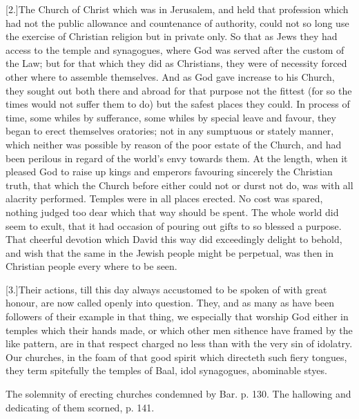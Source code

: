 [2.]The Church of Christ which was in Jerusalem, and held that profession which had not the public allowance and countenance of authority, could not so long use the exercise of Christian religion but in private only. So that as Jews they had access to the temple and synagogues, where God was served after the custom of the Law; but for that which they did as Christians, they were of necessity forced other where to assemble themselves. And as God gave increase to his Church, they sought out both there and abroad for that purpose not the fittest (for so the times would not suffer them to do) but the safest places they could. In process of time, some whiles by sufferance, some whiles by special leave and favour, they began to erect themselves oratories; not in any sumptuous or stately manner, which neither was possible by reason of the poor estate of the Church, and had been perilous in regard of the world’s envy towards them. At the length, when it pleased God to raise up kings and emperors favouring sincerely the Christian truth, that which the Church before either could not or durst not do, was with all alacrity performed. Temples were in all places erected. No cost was spared, nothing judged too dear which that way should be spent. The whole world did seem to exult, that it had occasion of pouring out gifts to so blessed a purpose. That cheerful devotion which David this way did exceedingly delight to behold, and wish that the same in the Jewish people might be perpetual, was then in Christian people every where to be seen.

[3.]Their actions, till this day always accustomed to be spoken of with great honour, are now called openly into question. They, and as many as have been followers of their example in that thing, we especially that worship God either in temples which their hands made, or which other men  sithence have framed by the like pattern, are in that respect charged no less than with the very sin of idolatry.
 Our churches, in the foam of that good spirit which directeth such fiery tongues, they term spitefully the temples of Baal, idol synagogues, abominable styes.


The solemnity of erecting churches condemned by Bar. p. 130. The hallowing and dedicating of them scorned, p. 141.
